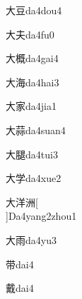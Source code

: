 \begin{verbete}[3;7]{大豆}{da4dou4}
\end{verbete}

\begin{verbete}[3;4]{大夫}{da4fu0}
\end{verbete}

\begin{verbete}[3;13]{大概}{da4gai4}
\end{verbete}

\begin{verbete}[3;10]{大海}{da4hai3}
\end{verbete}

\begin{verbete}[3;10]{大家}{da4jia1}
\end{verbete}

\begin{verbete}[3;13]{大蒜}{da4suan4}
\end{verbete}

\begin{verbete}[3;13]{大腿}{da4tui3}
\end{verbete}

\begin{verbete}[3;8]{大学}{da4xue2}
\end{verbete}

\begin{verbete}[3;9;9]{大洋洲}[\\]{Da4yang2zhou1}
\end{verbete}

\begin{verbete}[3;8]{大雨}{da4yu3}
\end{verbete}

\begin{verbete}[9]{带}{dai4}
\end{verbete}

\begin{verbete}[17]{戴}{dai4}
\end{verbete}

